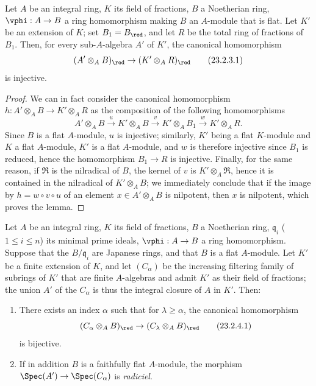 \begin{lemma}[23.2.3]
\label{0.23.2.3}
Let $A$ be an integral ring, $K$ its field of fractions, $B$ a Noetherian ring, $\vphi:A\to B$ a ring homomorphism making $B$ an $A$-module that is flat.
Let $K'$ be an extension of $K$; set $B_1=B_\red$, and let $R$ be the total ring of fractions of $B_1$.
Then, for every sub-$A$-algebra $A'$ of $K'$, the canonical homomorphism
\[
\label{0.23.2.3.1}
  (A'\otimes_A B)_\red\to(K'\otimes_A R)_\red
  \tag{23.2.3.1}
\]
is injective.
\end{lemma}

\begin{proof}
We can in fact consider the canonical homomorphism $h:A'\otimes_A B\to K'\otimes_A R$ as the composition of the following homomorphisms
\[
  A'\otimes_A B\xrightarrow{u}K'\otimes_A B\xrightarrow{v}K'\otimes_A B_1\xrightarrow{w}K'\otimes_A R.
\]
Since $B$ is a flat $A$-module, $u$ is injective; similarly, $K'$ being a flat $K$-module and $K$ a flat $A$-module, $K'$ is a flat $A$-module, and $w$ is therefore injective since $B_1$ is reduced, hence the homomorphism $B_1\to R$ is injective.
Finally, for the same reason, if $\mathfrak{R}$ is the nilradical of $B$, the kernel of $v$ is $K'\otimes_A\mathfrak{R}$, hence it is contained in the nilradical of $K'\otimes_A B$; we immediately conclude that if the image by $h=w\circ v\circ u$ of an element $x\in A'\otimes_A B$ is nilpotent, then $x$ is nilpotent, which proves the lemma.
\end{proof}

\begin{proposition}[23.2.4]
\label{0.23.2.4}
Let $A$ be an integral ring, $K$ its field of fractions, $B$ a Noetherian ring, $\mathfrak{q}_i$ ($1\leq i\leq n$) its minimal prime ideals, $\vphi:A\to B$ a ring homomorphism.
Suppose that the $B/\mathfrak{q}_i$ are Japanese rings, and that $B$ is a flat $A$-module.
Let $K'$ be a finite extension of $K$, and let $(C_\alpha)$ be the increasing filtering family of subrings of $K'$ that are finite $A$-algebras and admit $K'$ as their field of fractions; the union $A'$ of the $C_\alpha$ is thus the integral closure of $A$ in $K'$.
Then:
\begin{enumerate}
  \item[{\rm(i)}] There exists an index $\alpha$ such that for $\lambda\geq\alpha$, the canonical homomorphism
    \[
    \label{0.23.2.4.1}
      (C_\alpha\otimes_A B)_\red\to(C_\lambda\otimes_A B)_\red
      \tag{23.2.4.1}
    \]
    is bijective.
  \item[{\rm(ii)}] If in addition $B$ is a faithfully flat $A$-module, the morphism $\Spec(A')\to\Spec(C_\alpha)$ is \emph{radiciel}.
\end{enumerate}
\end{proposition}

